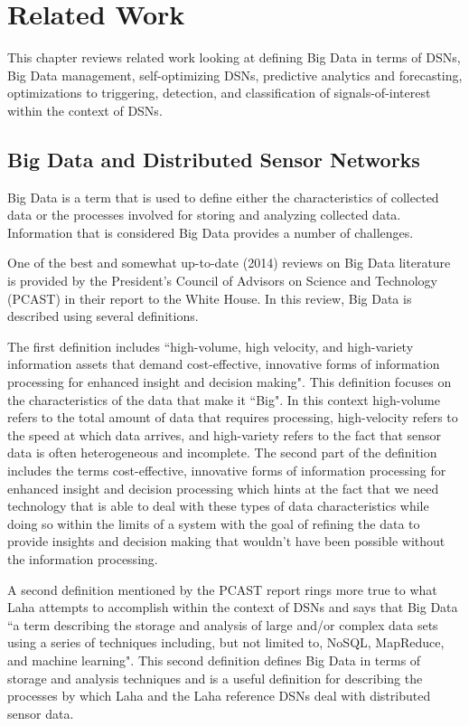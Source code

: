 \chapter{Related Work}\label{ch:related-work}
This chapter reviews related work looking at defining Big Data in terms of DSNs, Big Data management, self-optimizing DSNs, predictive analytics and forecasting, optimizations to triggering, detection, and classification of signals-of-interest within the context of DSNs.

\section{Big Data and Distributed Sensor Networks}\label{sec:big-data-and-distributed-sensor-networks}
Big Data is a term that is used to define either the characteristics of collected data or the processes involved for storing and analyzing collected data. Information that is considered Big Data provides a number of challenges.

One of the best and somewhat up-to-date (2014) reviews on Big Data literature is provided by the President's Council of Advisors on Science and Technology (PCAST) in their report to the White House\cite{house2014big}. In this review, Big Data is described using several definitions.

The first definition includes ``high-volume, high velocity, and high-variety information assets that demand cost-effective, innovative forms of information processing for enhanced insight and decision making"\cite{gartner_it_glossary_2016}. This definition focuses on the characteristics of the data that make it ``Big". In this context high-volume refers to the total amount of data that requires processing, high-velocity refers to the speed at which data arrives, and high-variety refers to the fact that sensor data is often heterogeneous and incomplete. The second part of the definition includes the terms cost-effective, innovative forms of information processing for enhanced insight and decision processing which hints at the fact that we need technology that is able to deal with these types of data characteristics while doing so within the limits of a system with the goal of refining the data to provide insights and decision making that wouldn't have been possible without the information processing.

A second definition\cite{ward2013undefined}  mentioned by the PCAST report rings more true to what Laha attempts to accomplish within the context of DSNs and says that Big Data ``a term describing the storage and analysis of large and/or complex data sets using a series of techniques including, but not limited to, NoSQL, MapReduce, and machine learning". This second definition defines Big Data in terms of storage and analysis techniques and is a useful definition for describing the processes by which Laha and the Laha reference DSNs deal with distributed sensor data.

